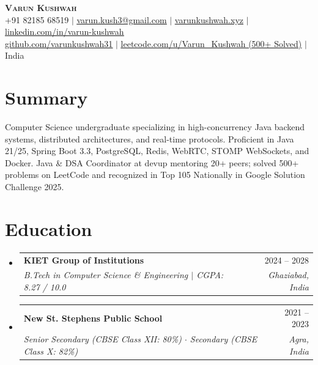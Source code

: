 \documentclass[letterpaper,10pt]{article}
\makeatletter
\newcommand{\resumeSubheading}[4]{
  \vspace{-1.5pt}\item
    \begin{tabular*}{0.97\textwidth}[t]{l@{\extracolsep{\fill}}r}
      \textbf{#1} & #2 \\
      \textit{\small#3} & \textit{\small #4} \\
    \end{tabular*}\vspace{-5pt}
}
\newcommand{\resumeSubHeadingListStart}{\begin{itemize}[leftmargin=*,label={}]}
\newcommand{\resumeSubHeadingListEnd}{\end{itemize}}
\makeatother
\begin{document}
\begin{center}
    \textbf{\Huge \scshape Varun Kushwah} \\ \vspace{2pt}
    \small +91 82185 68519 $|$ \href{mailto:varun.kush3@gmail.com}{\underline{varun.kush3@gmail.com}} $|$ 
    \href{https://varunkushwah.xyz}{\underline{varunkushwah.xyz}} $|$ 
    \href{https://linkedin.com/in/varun-kushwah}{\underline{linkedin.com/in/varun-kushwah}} \\ \vspace{1pt}
    \href{https://github.com/varunkushwah31}{\underline{github.com/varunkushwah31}} $|$
    \href{https://leetcode.com/u/Varun_Kushwah/}{\underline{leetcode.com/u/Varun\_Kushwah (500+ Solved)}} $|$
    \small India
\end{center}

\section{Summary}
\small{Computer Science undergraduate specializing in high-concurrency Java backend systems, distributed architectures, and real-time protocols. Proficient in Java 21/25, Spring Boot 3.3, PostgreSQL, Redis, WebRTC, STOMP WebSockets, and Docker. Java \& DSA Coordinator at devup mentoring 20+ peers; solved 500+ problems on LeetCode and recognized in Top 105 Nationally in Google Solution Challenge 2025.}

\section{Education}
  \resumeSubHeadingListStart
    \resumeSubheading
      {KIET Group of Institutions}{2024 -- 2028}
      {B.Tech in Computer Science \& Engineering $|$ CGPA: 8.27 / 10.0}{Ghaziabad, India}
    \resumeSubheading
      {New St. Stephens Public School}{2021 -- 2023}
      {Senior Secondary (CBSE Class XII: 80\%) $\cdot$ Secondary (CBSE Class X: 82\%)}{Agra, India}
  \resumeSubHeadingListEnd

\end{document}
